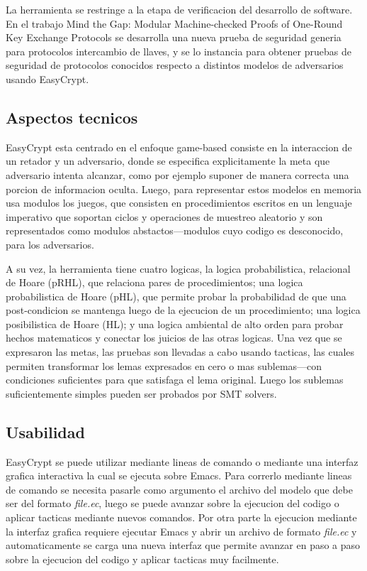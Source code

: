 \documentclass[runningheads]{llncs}
\begin{document}
La herramienta se restringe a la etapa de verificacion del desarrollo de software. En el trabajo Mind the Gap: Modular Machine-checked Proofs of One-Round Key Exchange Protocols\cite{ref_article2} se desarrolla una nueva prueba de seguridad generia para protocolos intercambio de llaves, y se lo instancia para obtener pruebas de seguridad de protocolos conocidos respecto a distintos modelos de adversarios usando EasyCrypt.

\subsection{Aspectos tecnicos}

EasyCrypt esta centrado en el enfoque game-based consiste en la interaccion de un retador y un adversario, donde se especifica explicitamente la meta que adversario intenta alcanzar, como por ejemplo suponer de manera correcta una porcion de informacion oculta. Luego, para representar estos modelos en memoria usa modulos los juegos, que consisten en procedimientos escritos en un lenguaje imperativo que soportan ciclos y operaciones de muestreo aleatorio y son representados como modulos abstactos—modulos cuyo codigo es desconocido, para los adversarios.

A su vez, la herramienta tiene cuatro logicas, la logica probabilistica, relacional de Hoare (pRHL), que relaciona pares de procedimientos; una logica probabilistica de Hoare (pHL), que permite probar la probabilidad de que una post-condicion se mantenga luego de la ejecucion de un procedimiento; una logica posibilistica de Hoare (HL); y una logica ambiental de alto orden para probar hechos matematicos y conectar los juicios de las otras logicas. Una vez que se expresaron las metas, las pruebas son llevadas a cabo usando tacticas, las cuales permiten transformar los lemas expresados en cero o mas sublemas—con condiciones suficientes para que satisfaga el lema original. Luego los sublemas suficientemente simples pueden ser probados por SMT solvers.

\subsection{Usabilidad}
EasyCrypt se puede utilizar mediante lineas de comando o mediante una interfaz grafica interactiva la cual se ejecuta sobre Emacs\cite{ref_webpage2}. Para correrlo mediante lineas de comando se necesita pasarle como argumento el archivo del modelo que debe ser del formato \textit{file.ec}, luego se puede avanzar sobre la ejecucion del codigo o aplicar tacticas mediante nuevos comandos. Por otra parte la ejecucion mediante la interfaz grafica requiere ejecutar Emacs y abrir un archivo de formato \textit{file.ec} y automaticamente se carga una nueva interfaz que permite avanzar en paso a paso sobre la ejecucion del codigo y aplicar tacticas muy facilmente.
\end{document}
